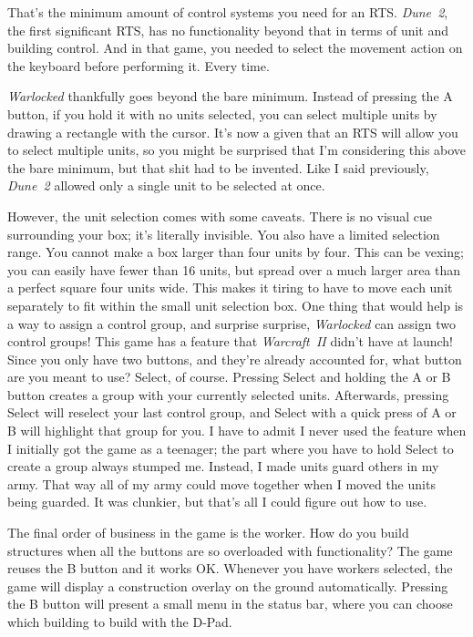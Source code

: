 \documentclass{book}
\begin{document}
That’s the minimum amount of control systems you need for an RTS. \emph{Dune~2}, the first significant RTS, has no functionality beyond that in terms of unit and building control. And in that game, you needed to select the movement action on the keyboard before performing it. Every time.\par
\emph{Warlocked} thankfully goes beyond the bare minimum. Instead of pressing the A button, if you hold it with no units selected, you can select multiple units by drawing a rectangle with the cursor. It’s now a given that an RTS will allow you to select multiple units, so you might be surprised that I’m considering this above the bare minimum, but that shit had to be invented. Like I said previously, \emph{Dune~2} allowed only a single unit to be selected at once.\par
\FloatBarrier\vspace{\baselineskip}\begin{figure}[H]\end{figure}
However, the unit selection comes with some caveats. There is no visual cue surrounding your box; it’s literally invisible. You also have a limited selection range. You cannot make a box larger than four units by four. This can be vexing; you can easily have fewer than 16 units, but spread over a much larger area than a perfect square four units wide. This makes it tiring to have to move each unit separately to fit within the small unit selection box. One thing that would help is a way to assign a control group, and surprise surprise, \emph{Warlocked} can assign two control groups! This game has a feature that \emph{Warcraft~II} didn’t have at launch! Since you only have two buttons, and they’re already accounted for, what button are you meant to use? Select, of course. Pressing Select and holding the A or B button creates a group with your currently selected units. Afterwards, pressing Select will reselect your last control group, and Select with a quick press of A or B will highlight that group for you. I have to admit I never used the feature when I initially got the game as a teenager; the part where you have to hold Select to create a group always stumped me. Instead, I made units guard others in my army. That way all of my army could move together when I moved the units being guarded. It was clunkier, but that’s all I could figure out how to use.\par
The final order of business in the game is the worker. How do you build structures when all the buttons are so overloaded with functionality? The game reuses the B button and it works OK. Whenever you have workers selected, the game will display a construction overlay on the ground automatically. Pressing the B button will present a small menu in the status bar, where you can choose which building to build with the D-Pad.\par
\end{document}
